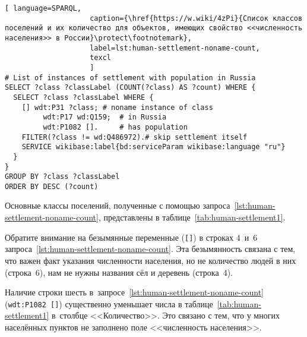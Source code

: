 \begin{lstlisting}[ language=SPARQL, 
                    caption={\href{https://w.wiki/4zPi}{Список классов поселений и их количество для объектов, имеющих свойство <<численность населения>> в России}\protect\footnotemark},
                    label=lst:human-settlement-noname-count,
                    texcl 
                    ]
# List of instances of settlement with population in Russia
SELECT ?class ?classLabel (COUNT(?class) AS ?count) WHERE {
  SELECT ?class ?classLabel WHERE {
    [] wdt:P31 ?class; # noname instance of class
         wdt:P17 wd:Q159;  # in Russia
         wdt:P1082 [].     # has population
    FILTER(?class != wd:Q486972).# skip settlement itself
    SERVICE wikibase:label{bd:serviceParam wikibase:language "ru"}
  }
}
GROUP BY ?class ?classLabel
ORDER BY DESC (?count)
\end{lstlisting}%

Основные классы поселений, полученные с помощью запроса~\ref{lst:human-settlement-noname-count}, 
представлены в таблице~\ref{tab:human-settlement1}. 

Обратите внимание на безымянные переменные (\lstinline|[]|) 
в строках 4~и~6 запроса~\ref{lst:human-settlement-noname-count}. 
Эта безымянность связана с тем, что 
важен факт указания численности населения, но не количество людей в них (строка~6),  
нам не нужны названия сёл и деревень (строка~4).  

Наличие строки шесть в~запросе~\ref{lst:human-settlement-noname-count} 
(\lstinline|wdt:P1082 []|) 
существенно уменьшает числа в таблице~\ref{tab:human-settlement1} 
в~столбце <<Количество>>. 
Это связано с тем, что у многих населённых пунктов 
не заполнено поле <<численность населения>>. 



